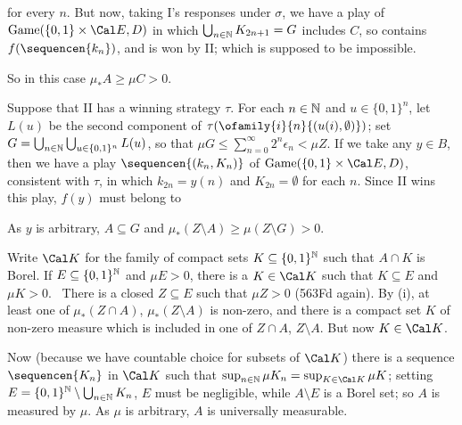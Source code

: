 {


\noindent for every $n$.   But now, taking I's responses under $\sigma$,
we have a play of $\Game(\{0,1\}\times\Cal E,D)$
in which $\bigcup_{n\in\Bbb N}K_{2n+1}=G$
includes $C$, so contains $f(\sequencen{k_n})$, and is won by II;  which is
supposed to be impossible.\ \Bang

So in this case $\mu_*A\ge\mu C>0$.

\medskip

 Suppose that II has a winning strategy $\tau$.
For each $n\in\Bbb N$ and $u\in\{0,1\}^n$, let $L(u)$ be the second
component of
$\tau(\ofamily{i}{n}{(u(i),\emptyset)})$;  set
$G=\bigcup_{n\in\Bbb N}\bigcup_{u\in\{0,1\}^n}L(u)$, so that
$\mu G\le\sum_{n=0}^{\infty}2^n\epsilon_n<\mu Z$.   If we take any
$y\in B$, then we have a play $\sequencen{(k_n,K_n)}$
of $\Game(\{0,1\}\times\Cal E,D)$,
consistent with $\tau$, in which $k_{2n}=y(n)$ and $K_{2n}=\emptyset$ for
each $n$.   Since II wins this play, $f(y)$ must belong to


\noindent As $y$ is arbitrary, $A\subseteq G$
and $\mu_*(Z\setminus A)\ge\mu(Z\setminus G)>0$.\ \Qed

\medskip

 Write $\Cal K$ for the family of compact sets
$K\subseteq\{0,1\}^{\Bbb N}$ such that $A\cap K$ is Borel.
If $E\subseteq\{0,1\}^{\Bbb N}$ and $\mu E>0$, there is a
$K\in\Cal K$ such that $K\subseteq E$ and $\mu K>0$.   \Prf\ There is a
closed $Z\subseteq E$ such that $\mu Z>0$ (563Fd again).   By (i),
at least one of $\mu_*(Z\cap A)$,
$\mu_*(Z\setminus A)$ is non-zero, and there is a compact
set $K$ of non-zero measure which is included in one of $Z\cap A$,
$Z\setminus A$.   But now $K\in\Cal K$.\ \Qed

Now (because we have countable choice for subsets of $\Cal K$)
there is a
sequence $\sequencen{K_n}$ in $\Cal K$ such that
$\sup_{n\in\Bbb N}\mu K_n=\sup_{K\in\Cal K}\mu K$;  setting
$E=\{0,1\}^{\Bbb N}\setminus\bigcup_{n\in\Bbb N}K_n$, $E$ must be
negligible, while $A\setminus E$ is a Borel set;  so $A$ is measured by
$\hat\mu$.   As $\mu$ is arbitrary, $A$ is universally measurable.

}
